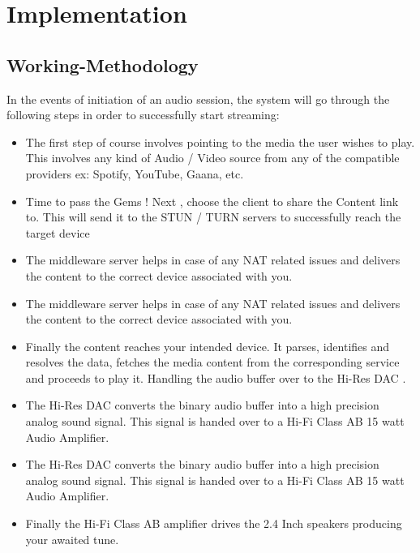 \chapter{Implementation}

\section{Working-Methodology}

In the events of initiation of an audio session, the system will go through the
following steps in order to successfully start streaming:\\

\begin{itemize}
    \item  The first step of course involves pointing to the media the user wishes to play.
 This involves any kind of Audio / Video source from any of the compatible providers 
 ex: Spotify, YouTube, Gaana, etc.
    \item  Time to pass the Gems ! Next , choose the client to share the Content link to.
  This will send it to the STUN / TURN servers to successfully reach the target device
    \item  The  middleware server helps in
 case of any NAT related issues and delivers the content to the correct device associated with you.
    \item  The  middleware server helps in
 case of any NAT related issues and delivers the content to the correct device associated with you.
    \item Finally the content reaches your intended device.
It parses, identifies and resolves the data, fetches the media content 
from the corresponding service and proceeds to play it. Handling the audio buffer over to the Hi-Res DAC .
    \item The Hi-Res DAC converts the binary audio buffer into a high precision analog sound signal.
 This signal is handed over to a Hi-Fi Class AB 15 watt Audio Amplifier.
    \item The Hi-Res DAC converts the binary audio buffer into a high precision analog sound signal.
 This signal is handed over to a Hi-Fi Class AB 15 watt Audio Amplifier.
    \item Finally the Hi-Fi Class AB amplifier drives the 2.4 Inch speakers producing your awaited tune.
    
\end{itemize}

 











